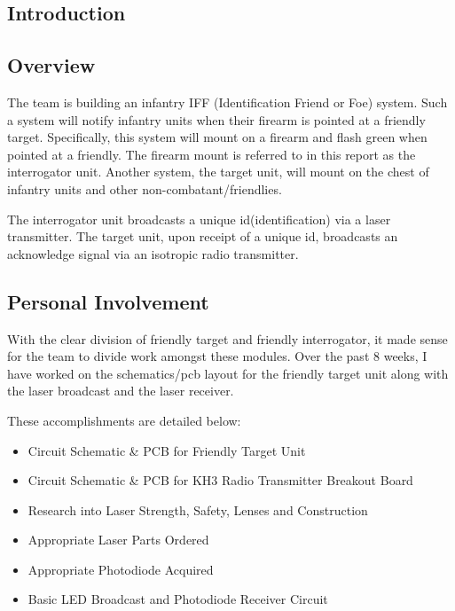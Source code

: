 \documentclass[letterpaper,10pt]{article}
\newcommand{\buildtoc}{
	\clearpage
	\singlespacing
	\tableofcontents
	\onehalfspacing
}
\begin{document}
\begin{spacing}{1.15}


\color{black}
\buildtoc
{}
\clearpage
\setcounter{page}{1}

\section{Introduction}
\subsection{Overview}
The team is building an infantry IFF (Identification Friend or Foe) system. Such a system will notify infantry units when their firearm is pointed at a friendly target. Specifically, this system will mount on a firearm and flash green when pointed at a friendly. The firearm mount is referred to in this report as the interrogator unit. Another system, the target unit, will mount on the chest of infantry units and other non-combatant/friendlies. 

The interrogator unit broadcasts a unique id(identification) via a laser transmitter. The target unit, upon receipt of a unique id, broadcasts an acknowledge signal via an isotropic radio transmitter. 

\subsection{Personal Involvement}
With the clear division of friendly target and friendly interrogator, it made sense for the team to divide work amongst these modules. Over the past 8 weeks, I have worked on the schematics/pcb layout for the friendly target unit along with the laser broadcast and the laser receiver. 

These accomplishments are detailed below:
\begin{itemize}
	\item Circuit Schematic \& PCB for Friendly Target Unit
	\item Circuit Schematic \& PCB for KH3 Radio Transmitter Breakout Board
	\item Research into Laser Strength, Safety, Lenses and Construction
	\item Appropriate Laser Parts Ordered
	\item Appropriate Photodiode Acquired
	\item Basic LED Broadcast and Photodiode Receiver Circuit 
\end{itemize}


\end{spacing}
\end{document}
